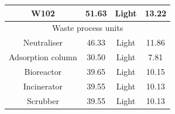 \begin{table}[H]
\begin{tabular}{cccc}
W102                    &   51.63             &     Light                      &  13.22                              \\\hline
\multicolumn{4}{c}{Waste process units}                                                        \\\hline
Neutraliser                    &   46.33            &     Light                      &   11.86                                 \\
Adsorption column                    &   30.50             &     Light                      &  7.81     \\         
Bioreactor                    &   39.65            &     Light                      &   10.15                                 \\
Incinerator                 &   39.55             &     Light                      &  10.13     \\    
Scrubber                 &   39.55             &     Light                      &  10.13     \\\bottomrule

\end{tabular}
\end{table}